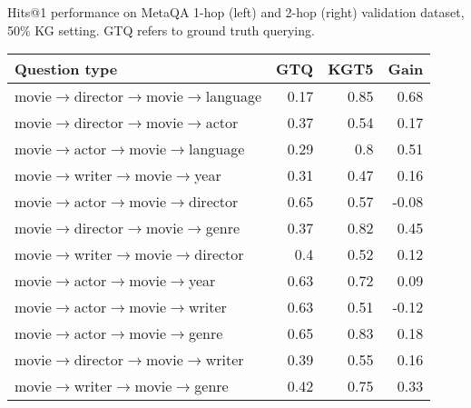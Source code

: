 \documentclass[11pt]{article}
\renewcommand\:{\colon} \newcommand{\sset}[1]{\left\{\,#1\,\right\}} \newcommand{\ssets}[1]{\left\{#1\right\}} \newcommand{\ssetn}[1]{\{\,#1\,\}}
\begin{document}
\begin{table*}[!htb]
{\begin{minipage}{.6\linewidth}
\end{minipage}}
\caption{Hits@1 performance on MetaQA 1-hop (left) and 2-hop (right) validation dataset, 50\% KG setting. GTQ refers to ground truth querying.}
\label{tab:metaqa_analysis_2hop}
\end{table*}








\begin{table*}[ht!]
\centering
\begin{tabular}{@{}lrrr@{}}
\toprule
\textbf{Question type} & \multicolumn{1}{l}{\textbf{GTQ}} & \multicolumn{1}{l}{\textbf{KGT5}} & \multicolumn{1}{l}{\textbf{Gain}} \\ \midrule
movie$\rightarrow$director$\rightarrow$movie$\rightarrow$language & 0.17 & 0.85 & \cellcolor[HTML]{57BB8A}0.68  \\
movie$\rightarrow$director$\rightarrow$movie$\rightarrow$actor    & 0.37 & 0.54 & \cellcolor[HTML]{D5EEE2}0.17  \\
movie$\rightarrow$actor$\rightarrow$movie$\rightarrow$language    & 0.29 & 0.8  & \cellcolor[HTML]{81CCA8}0.51  \\
movie$\rightarrow$writer$\rightarrow$movie$\rightarrow$year       & 0.31 & 0.47 & \cellcolor[HTML]{D8EFE4}0.16  \\
movie$\rightarrow$actor$\rightarrow$movie$\rightarrow$director    & 0.65 & 0.57 & \cellcolor[HTML]{F7D7D5}-0.08 \\
movie$\rightarrow$director$\rightarrow$movie$\rightarrow$genre    & 0.37 & 0.82 & \cellcolor[HTML]{90D3B2}0.45  \\
movie$\rightarrow$writer$\rightarrow$movie$\rightarrow$director   & 0.4  & 0.52 & \cellcolor[HTML]{E2F3EB}0.12  \\
movie$\rightarrow$actor$\rightarrow$movie$\rightarrow$year        & 0.63 & 0.72 & \cellcolor[HTML]{E9F7F0}0.09  \\
movie$\rightarrow$actor$\rightarrow$movie$\rightarrow$writer      & 0.63 & 0.51 & \cellcolor[HTML]{F7D7D5}-0.12 \\
movie$\rightarrow$actor$\rightarrow$movie$\rightarrow$genre       & 0.65 & 0.83 & \cellcolor[HTML]{D3EEE1}0.18  \\
movie$\rightarrow$director$\rightarrow$movie$\rightarrow$writer   & 0.39 & 0.55 & \cellcolor[HTML]{D8EFE4}0.16  \\
movie$\rightarrow$writer$\rightarrow$movie$\rightarrow$genre      & 0.42 & 0.75 & \cellcolor[HTML]{AEDEC7}0.33  \\

\end{tabular}
\end{table*}
\end{document}
